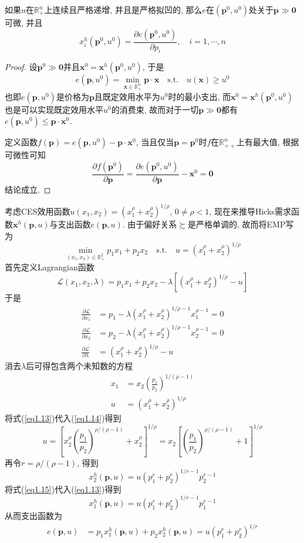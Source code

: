 \documentclass[cn, 12pt, math=mtpro2, bibstyle=apa, blue]{elegantbook}
\newcommand{\R}{\mathbb{R}}
\newcommand{\p}{\mathbf{p}}
\newcommand{\x}{\mathbf{x}}
\begin{document}
\begin{theorem}[Shephard引理]
  如果$u$在$\R_+^n$上连续且严格递增, 并且是严格拟凹的, 那么$e$在$(\p^0,u^0)$处关于$\p\gg\mathbf{0}$可微, 并且
  $$x_i^h(\p^0,u^0)=\frac{\partial e(\p^0,u^0)}{\partial p_i},\quad i=1,\cdots,n$$
\end{theorem}
\begin{proof}
  设$\p^0\gg\mathbf{0}$并且$\x^0=\x^h(\p^0,u^0)$, 于是
  $$e(\p,u^0)=\min_{\x\in\R_+^n}\p\cdot\x\quad\text{s.t.}\quad u(\x)\ge u^0$$
  也即$e(\p,u^0)$是价格为$\p$且既定效用水平为$u^0$时的最小支出, 而$\x^0=\x^h(\p^0,u^0)$也是可以实现既定效用水平$u^0$的消费束, 故而对于一切$\p\gg\mathbf{0}$都有$e(\p,u^0)\leq \p\cdot\x^0$.

  定义函数$f(\p)=e(\p,u^0)-\p\cdot\x^0$, 当且仅当$\p=\p^0$时$f$在$\R_{++}^n$上有最大值, 根据可微性可知
  $$\frac{\partial f(\p^0)}{\partial \p}=\frac{\partial e(\p^0,u^0)}{\partial \p}-\x^0=\mathbf{0}$$
  结论成立.
\end{proof}
\begin{example}
考虑CES效用函数$u(x_1,x_2)=(x_1^\rho+x_2^\rho)^{1/\rho}$, $0\neq\rho<1$, 现在来推导Hicks需求函数$\x^h(\p,u)$与支出函数$e(\p,u)$. 由于偏好关系$\succsim$是严格单调的, 故而将EMP写为
$$\min_{(x_1,x_2)\in\R_+^2}p_1x_1+p_2x_2\quad\text{s.t.}\quad u=(x_1^\rho+x_2^\rho)^{1/\rho}$$
首先定义Lagrangian函数
$$\mathcal{L}(x_1,x_2,\lambda)=p_1x_1+p_2x_2-\lambda[(x_1^\rho+x_2^\rho)^{1/\rho}-u]$$
于是
\begin{align*}
\frac{\partial\mathcal{L}}{\partial x_1}&=p_1-\lambda(x_1^\rho+x_2^\rho)^{1/\rho-1}x_1^{\rho-1}=0 \\
\frac{\partial\mathcal{L}}{\partial x_2}&=p_2-\lambda(x_1^\rho+x_2^\rho)^{1/\rho-1}x_2^{\rho-1}=0 \\
\frac{\partial\mathcal{L}}{\partial\lambda}&=(x_1^\rho+x_2^\rho)^{1/\rho}-u
\end{align*}
消去$\lambda$后可得包含两个未知数的方程
\begin{align}
x_1&=x_2\left(\frac{p_1}{p_2}\right)^{1/(\rho-1)} \label{eq1.13} \\
u&=(x_1^\rho+x_2^\rho)^{1/\rho} \label{eq1.14}
\end{align}
将式(\ref{eq1.13})代入(\ref{eq1.14})得到
$$  u=\left[x_2^\rho\left(\frac{p_1}{p_2}\right)^{\rho/(\rho-1)}+x_2^\rho\right]^{1/\rho}=x_2\left[\left(\frac{p_1}{p_2}\right)^{\rho/(\rho-1)}+1\right]^{1/\rho}
$$
再令$r=\rho/(\rho-1)$, 得到
\begin{equation}\label{eq1.15}
  x_2^h(\p,u)=u(p_1^r+p_2^r)^{1/r-1}p_2^{r-1}
\end{equation}
将式(\ref{eq1.15})代入(\ref{eq1.13})得到
$$  x_1^h(\p,u)=u(p_1^r+p_2^r)^{1/r-1}p_1^{r-1}
$$
从而支出函数为
\begin{align*}
e(\p,u)&=p_1x_1^h(\p,u)+p_2x_2^h(\p,u)=u(p_1^r+p_2^r)^{1/r}
\end{align*}
\end{example}
\end{document}
